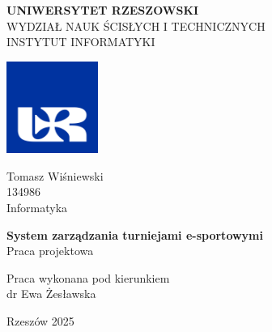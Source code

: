 \documentclass[12pt, a4paper]{article}
\begin{document}
\begin{titlepage}
    \begin{flushleft}
        \Large\textbf{UNIWERSYTET RZESZOWSKI} \\
        \normalsize WYDZIAŁ NAUK ŚCISŁYCH I TECHNICZNYCH \\
        \normalsize INSTYTUT INFORMATYKI
    \end{flushleft}
    \hfill
    \begin{flushright}
        \includegraphics[width=3cm]{UR;-sygnet-niebieski.jpg} 
    \end{flushright}

    \vspace{4cm}

    \begin{center}
        \Large Tomasz Wiśniewski \\
        \normalsize 134986 \\ 
        \normalsize Informatyka
    \end{center}

    \vspace{2cm}

    \begin{center}
        \huge\textbf{System zarządzania turniejami e-sportowymi} \\
        \vspace{1cm}
        \Large Praca projektowa
    \end{center}

    \vfill

    \begin{flushright}
        \normalsize Praca wykonana pod kierunkiem \\
        \normalsize dr Ewa Żesławska
    \end{flushright}

    \vspace{2cm}
    
    \begin{center}
        \normalsize Rzeszów 2025
    \end{center}
\end{titlepage}

\newpage
\tableofcontents
\newpage
\end{document}
